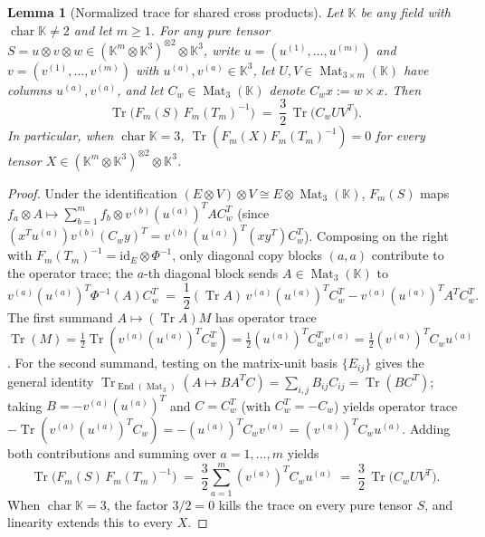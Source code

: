 \documentclass[11pt,reqno]{amsart}
\newtheorem{lemma}[theorem]{Lemma}
\theoremstyle{definition}
\theoremstyle{remark}
\numberwithin{equation}{section}
\newcommand{\KK}{\mathbb{K}}
\DeclareMathOperator{\Mat}{Mat}
\DeclareMathOperator{\End}{End}
\DeclareMathOperator{\Tr}{Tr}
\DeclareMathOperator{\chr}{char}
\begin{document}
\begin{lemma}[Normalized trace for shared cross products]\label{lem:Tm-norm-trace}
Let $\KK$ be any field with $\chr\KK \neq 2$ and let $m \ge 1$. For any pure tensor $S = u \otimes v \otimes w \in (\KK^m \otimes \KK^3)^{\otimes 2} \otimes \KK^3$, write $u = (u^{(1)}, \dots, u^{(m)})$ and $v = (v^{(1)}, \dots, v^{(m)})$ with $u^{(a)}, v^{(a)} \in \KK^3$, let $U, V \in \Mat_{3 \times m}(\KK)$ have columns $u^{(a)}, v^{(a)}$, and let $C_w \in \Mat_3(\KK)$ denote $C_w x := w \times x$. Then
\begin{equation}\label{eq:Tm-norm-trace}
  \Tr\bigl(F_m(S)\, F_m(T_m)^{-1}\bigr) \;=\; \frac{3}{2}\,\Tr\bigl(C_w U V^T\bigr).
\end{equation}
In particular, when $\chr\KK = 3$, $\Tr(F_m(X) F_m(T_m)^{-1}) = 0$ for every tensor $X \in (\KK^m \otimes \KK^3)^{\otimes 2} \otimes \KK^3$.
\end{lemma}

\begin{proof}
Under the identification $(E \otimes V) \otimes V \cong E \otimes \Mat_3(\KK)$, $F_m(S)$ maps $f_a \otimes A \mapsto \sum_{b=1}^m f_b \otimes v^{(b)} (u^{(a)})^T A C_w^T$ (since $(x^T u^{(a)}) v^{(b)} (C_w y)^T = v^{(b)} (u^{(a)})^T (x y^T) C_w^T$). Composing on the right with $F_m(T_m)^{-1} = \mathrm{id}_E \otimes \Phi^{-1}$, only diagonal copy blocks $(a, a)$ contribute to the operator trace; the $a$-th diagonal block sends $A \in \Mat_3(\KK)$ to
\[
  v^{(a)}(u^{(a)})^T \Phi^{-1}(A) C_w^T
  \;=\; \frac{1}{2}(\Tr A)\, v^{(a)}(u^{(a)})^T C_w^T - v^{(a)}(u^{(a)})^T A^T C_w^T.
\]
The first summand $A \mapsto (\Tr A) M$ has operator trace $\Tr(M) = \frac{1}{2}\Tr(v^{(a)}(u^{(a)})^T C_w^T) = \frac{1}{2}(u^{(a)})^T C_w^T v^{(a)} = \frac{1}{2}(v^{(a)})^T C_w u^{(a)}$. For the second summand, testing on the matrix-unit basis $\{E_{ij}\}$ gives the general identity $\Tr_{\End(\Mat_3)}(A \mapsto B A^T C) = \sum_{i,j} B_{ij} C_{ij} = \Tr(B C^T)$; taking $B = -v^{(a)}(u^{(a)})^T$ and $C = C_w^T$ (with $C_w^T = -C_w$) yields operator trace $-\Tr(v^{(a)}(u^{(a)})^T C_w) = -(u^{(a)})^T C_w v^{(a)} = (v^{(a)})^T C_w u^{(a)}$. Adding both contributions and summing over $a = 1, \dots, m$ yields
\[
  \Tr\bigl(F_m(S)\, F_m(T_m)^{-1}\bigr)
  \;=\; \frac{3}{2}\sum_{a=1}^m (v^{(a)})^T C_w u^{(a)}
  \;=\; \frac{3}{2}\,\Tr\bigl(C_w U V^T\bigr).
\]
When $\chr\KK = 3$, the factor $3/2 = 0$ kills the trace on every pure tensor $S$, and linearity extends this to every $X$.
\end{proof}
\end{document}
